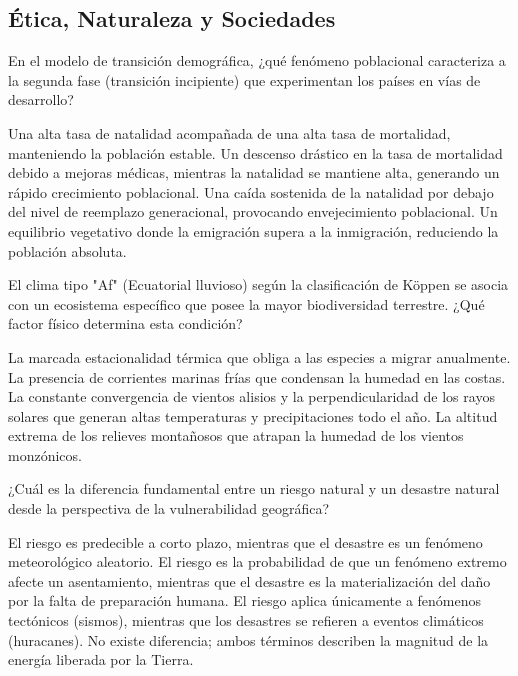 \documentclass[12pt]{evaluasep}
\begin{document}
\begin{questions}
\newpage
\section{Ética, Naturaleza y Sociedades}


     \question En el modelo de transición demográfica, ¿qué fenómeno poblacional caracteriza a la segunda fase (transición incipiente) que experimentan los países en vías de desarrollo?
    \begin{choices}
        \choice Una alta tasa de natalidad acompañada de una alta tasa de mortalidad, manteniendo la población estable.
        \CorrectChoice Un descenso drástico en la tasa de mortalidad debido a mejoras médicas, mientras la natalidad se mantiene alta, generando un rápido crecimiento poblacional.
        \choice Una caída sostenida de la natalidad por debajo del nivel de reemplazo generacional, provocando envejecimiento poblacional.
        \choice Un equilibrio vegetativo donde la emigración supera a la inmigración, reduciendo la población absoluta.
    \end{choices}
	 

    \question El clima tipo "Af" (Ecuatorial lluvioso) según la clasificación de Köppen se asocia con un ecosistema específico que posee la mayor biodiversidad terrestre. ¿Qué factor físico determina esta condición?
    \begin{choices}
        \choice La marcada estacionalidad térmica que obliga a las especies a migrar anualmente.
        \choice La presencia de corrientes marinas frías que condensan la humedad en las costas.
        \CorrectChoice La constante convergencia de vientos alisios y la perpendicularidad de los rayos solares que generan altas temperaturas y precipitaciones todo el año.
        \choice La altitud extrema de los relieves montañosos que atrapan la humedad de los vientos monzónicos.
    \end{choices}
	

    \question ¿Cuál es la diferencia fundamental entre un riesgo natural y un desastre natural desde la perspectiva de la vulnerabilidad geográfica?
    \begin{choices}
        \choice El riesgo es predecible a corto plazo, mientras que el desastre es un fenómeno meteorológico aleatorio.
        \CorrectChoice El riesgo es la probabilidad de que un fenómeno extremo afecte un asentamiento, mientras que el desastre es la materialización del daño por la falta de preparación humana.
        \choice El riesgo aplica únicamente a fenómenos tectónicos (sismos), mientras que los desastres se refieren a eventos climáticos (huracanes).
        \choice No existe diferencia; ambos términos describen la magnitud de la energía liberada por la Tierra.
    \end{choices}
	


\end{questions}
\end{document}
